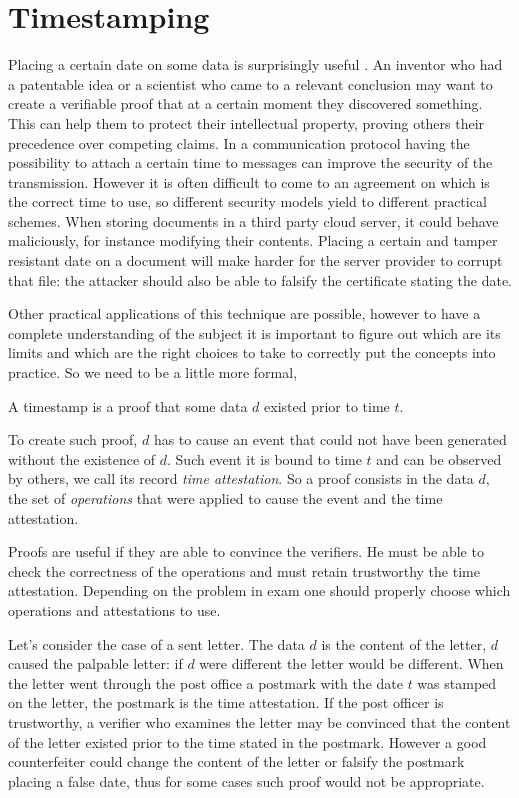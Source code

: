 \chapter{Timestamping}
\label{chpr:timestamping}
Placing a certain date on some data is surprisingly useful \cite{Haber91howto, Bayer93improvingthe, Massias99designof, OTSannouncment}.
An inventor who had a patentable idea or a scientist who came to a relevant conclusion may want to create a verifiable proof that at a certain moment they discovered something. This can help them to protect their intellectual property, proving others their precedence over competing claims.
In a communication protocol having the possibility to attach a certain time to messages can improve the security of the transmission. However it is often difficult to come to an agreement on which is the correct time to use, so different security models yield to different practical schemes.
When storing documents in a third party cloud server, it could behave maliciously, for instance modifying their contents. Placing a certain and tamper resistant date on a document will make harder for the server provider to corrupt that file: the attacker should also be able to falsify the certificate stating the date. 

Other practical applications of this technique are possible, however to have a complete understanding of the subject it is important to figure out which are its limits and which are the right choices to take to correctly put the concepts into practice. So we need to be a little more formal,
\begin{mydef}
	A timestamp is a proof that some data $d$ existed prior to time $t$.
\end{mydef}
To create such proof, $d$ has to cause an event that could not have been generated without the existence of $d$. Such event it is bound to time $t$ and can be observed by others, we call its record \textit{time attestation}. So a proof consists in the data $d$, the set of \textit{operations} that were applied to cause the event and the time attestation.

Proofs are useful if they are able to convince the verifiers. He must be able to check the correctness of the operations and must retain trustworthy the time attestation. Depending on the problem in exam one should properly choose which operations and attestations to use. 

Let's consider the case of a sent letter. The data $d$ is the content of the letter, $d$ caused the palpable letter: if $d$ were different the letter would be different. When the letter went through the post office a postmark with the date $t$ was stamped on the letter, the postmark is the time attestation. If the post officer is trustworthy, a verifier who examines the letter may be convinced that the content of the letter existed prior to the time stated in the postmark. However a good counterfeiter could change the content of the letter or falsify the postmark placing a false date, thus for some cases such proof would not be appropriate.

